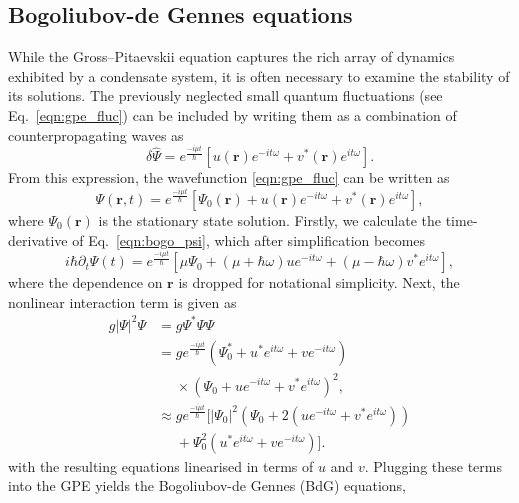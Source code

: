 \subsection{Bogoliubov-de Gennes equations}
\label{sec:bogo}
While the Gross--Pitaevskii equation captures the rich array of dynamics exhibited by a condensate system, it is often necessary to examine the stability of its solutions. The previously neglected small quantum fluctuations (see Eq.~\eqref{eqn:gpe_fluc}) can be included by writing them as a combination of counterpropagating waves as
\begin{equation}
    \delta\hat{\Psi} = e^{\frac{-i\mu t}{\hbar}}[u(\mathbf{r})e^{-it\omega} + v^{*}(\mathbf{r})e^{it\omega}].
\end{equation}
From this expression, the wavefunction \eqref{eqn:gpe_fluc} can be written as
\begin{equation}\label{eqn:bogo_psi}
\Psi(\mathbf{r},t) = e^{\frac{-i\mu t}{\hbar}}\left[\Psi_0(\mathbf{r}) + u(\mathbf{r})e^{-it\omega} + v^{*}(\mathbf{r})e^{it\omega} \right],
\end{equation}
where $\Psi_0(\mathbf{r})$ is the stationary state solution. Firstly, we calculate the time-derivative of Eq.~\eqref{eqn:bogo_psi}, which after simplification becomes
\begin{equation}\label{eqn:bogo_lhs}
    i\hbar\partial_t \Psi(t) = e^{\frac{-i\mu t}{\hbar}}\left[\mu\Psi_0 + (\mu+\hbar\omega)ue^{-it\omega} + (\mu-\hbar\omega)v^{*}e^{it\omega} \right],
\end{equation}
where the dependence on $\mathbf{r}$ is dropped for notational simplicity. Next, the nonlinear interaction term is given as
\begin{subequations}
\begin{align}\label{eqn:bogo_nonlin}
    g|\Psi|^2\Psi &= g\Psi^{*}\Psi\Psi \\
    &= g e^{\frac{-i\mu t}{\hbar}}(\Psi_0^{*} + u^{*}e^{it\omega} + ve^{-it\omega})\\ &~~~~~~\times (\Psi_0 + u e^{-it\omega} + v^{*} e^{it\omega})^2, \nonumber \\
    & \approx g e^{\frac{-i\mu t}{\hbar}}[|\Psi_0|^2(\Psi_0 + 2(u e^{-it\omega} + v^{*} e^{it\omega} )) \\ &~~~~~~+ \Psi_0^2( u^{*} e^{it\omega} + v e^{-it\omega})]. \nonumber
\end{align}
\end{subequations}
with the resulting equations linearised in terms of $u$ and $v$. Plugging these terms into the GPE yields the Bogoliubov-de Gennes (BdG) equations,

